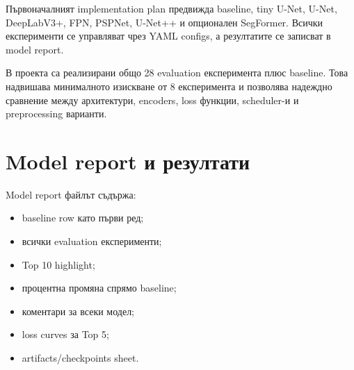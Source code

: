 \documentclass[12pt,a4paper]{article}
\begin{document}
Първоначалният implementation plan предвижда baseline, tiny U-Net, U-Net, DeepLabV3+, FPN, PSPNet, U-Net++ и опционален SegFormer. Всички експерименти се управляват чрез YAML configs, а резултатите се записват в model report.

В проекта са реализирани общо 28 evaluation експеримента плюс baseline. Това надвишава минималното изискване от 8 експеримента и позволява надеждно сравнение между архитектури, encoders, loss функции, scheduler-и и preprocessing варианти.

\section{Model report и резултати}

Model report файлът съдържа:

\begin{itemize}
  \item baseline row като първи ред;
  \item всички evaluation експерименти;
  \item Top 10 highlight;
  \item процентна промяна спрямо baseline;
  \item коментари за всеки модел;
  \item loss curves за Top 5;
  \item artifacts/checkpoints sheet.
\end{itemize}
\end{document}
